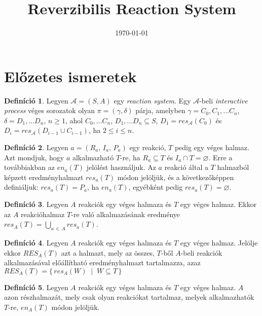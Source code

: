 \documentclass[12pt]{article}
\title{Reverzibilis Reaction System}
\date{\today}
\theoremstyle{definition}
\newtheorem*{definition*}{Definíció}
\theoremstyle{remark}
\theoremstyle{plain}
\theoremstyle{plain}
\let\emptyset\varnothing
\newcommand{\en}{\textit{en}}
\newcommand{\res}{\textit{res}}
\newcommand{\reaction}[3]{
    (#1, \, #2, \, #3)
}
\begin{document}
    \maketitle

    \section*{Előzetes ismeretek}

    \begin{definition*}
        Legyen $\mathscr{A} = (S, A)$ egy \textit{reaction system}. Egy $\mathscr{A}$-beli \textit{interactive process} véges sorozatok olyan $\pi = (\gamma, \delta)$ párja, amelyben $\gamma = C_{0}, C_{1}, \ldots C_{n}$, $\delta = D_{1}, \ldots D_{n}$, $n \geq 1$, ahol $C_{0}, \ldots C_{n}$, $D_{1}, \ldots D_{n} \subseteq S$, $D_{1} = \textit{res}_{\mathscr{A}}(C_{0})$ és $D_{i} = \textit{res}_{\mathscr{A}}(D_{i - 1} \cup C_{i - 1})$, ha $2 \leq i \leq n$.
    \end{definition*}

    \begin{definition*}
        Legyen $a = \reaction{R_{a}}{I_{a}}{P_{a}}$ egy reakció, $T$ pedig egy véges halmaz. Azt mondjuk, hogy $a$ alkalmazható $T$-re, ha $R_{a} \subseteq T$ és $I_{a} \cap T = \emptyset$. Erre a továbbiakban az $\en_{a}(T)$ jelölést használjuk. Az $a$ reakció által a $T$ halmazból képzett eredményhalmazt $\res_{a}(T)$ módon jelöljük, és a következőképpen definiáljuk: $\res_{a}(T) = P_{a}$, ha $\en_{a}(T)$, egyébként pedig $\res_{a}(T) = \emptyset$.
    \end{definition*}

    \begin{definition*}
        Legyen $A$ reakciók egy véges halmaza és $T$ egy véges halmaz. Ekkor az $A$ reakcióhalmaz $T$-re való alkalmazásának eredménye $\res_{A}(T) = \bigcup_{a \,\in\, A}\res_{a}(T)$.
    \end{definition*}

    \begin{definition*}
        Legyen $A$ reakciók egy véges halmaza és $T$ egy véges halmaz. Jelölje ekkor $\textit{RES}_{A}(T)$ azt a halmazt, mely az összes, $T$-ből $A$-beli reakciók alkalmazásával előállítható eredményhalmazt tartalmazza, azaz $\textit{RES}_{A}(T) = \{ \, \res_{A}(W) \; \mid \; W \subseteq T\, \}$
    \end{definition*}

    \begin{definition*}
        Legyen $A$ reakciók egy véges halmaza és $T$ egy véges halmaz. $A$ azon részhalmazát, mely csak olyan reakciókat tartalmaz, melyek alkalmazhatók $T$-re, $\en_{A}(T)$ módon jelöljük.
    \end{definition*}
    
\end{document}
